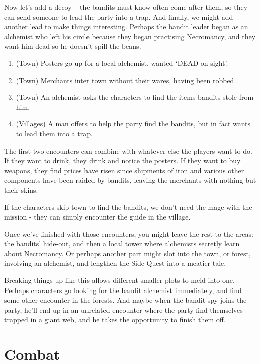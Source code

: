 \begin{multicols}{2}
Now let's add a decoy -- the bandits must know  often come after them, so they can send someone to lead the party into a trap.
And finally, we might add another lead to make things interesting.
Perhaps the bandit leader began as an alchemist who left his circle because they began practising Necromancy, and they want him dead so he doesn't spill the beans.

\begin{enumerate}
  \item
  (Town)
  Posters go up for a local alchemist, wanted `DEAD on sight'.
  \item
  (Town) 
  Merchants inter town without their wares, having been robbed.
  \item
  (Town)
  An alchemist asks the characters to find the items bandits stole from him.
  \item
  (Villages)
  A man offers to help the party find the bandits, but in fact wants to lead them into a trap.
\end{enumerate}

The first two encounters can combine with whatever else the players want to do.
If they want to drink, they drink and notice the posters.
If they want to buy weapons, they find prices have risen since shipments of iron and various other components have been raided by bandits, leaving the merchants with nothing but their skins.

If the characters skip town to find the bandits, we don't need the mage with the mission - they can simply encounter the guide in the village.

Once we've finished with those encounters, you might leave the rest to the areas: the bandits' hide-out, and then a local tower where alchemists secretly learn about Necromancy.
Or perhaps another part might slot into the town, or forest, involving an alchemist, and lengthen the Side Quest into a meatier tale.

Breaking things up like this allows different smaller plots to meld into one.
Perhaps characters go looking for the bandit alchemist immediately, and find some other encounter in the forests.
And maybe when the bandit spy joins the party, he'll end up in an unrelated encounter where the party find themselves trapped in a giant web, and he takes the opportunity to finish them off.

\end{multicols}

\section{Combat}

